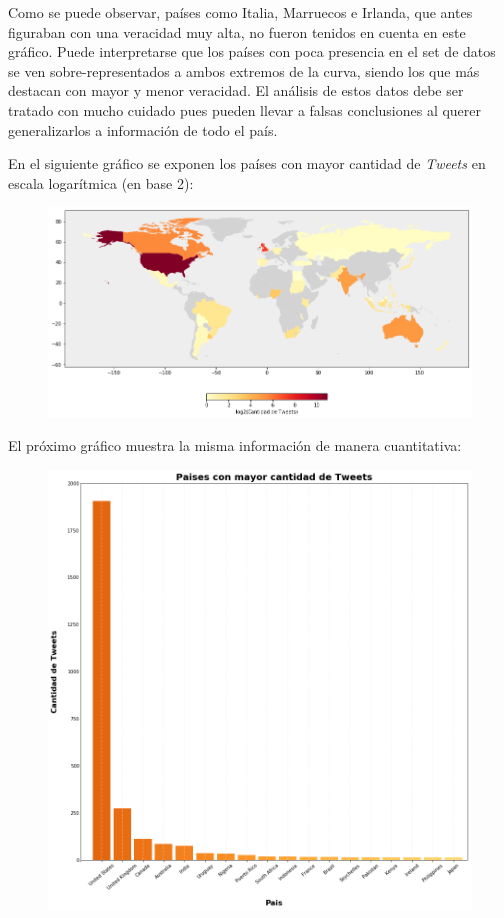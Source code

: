 \documentclass[titlepage,a4paper]{article}
\begin{document}
    Como se puede observar, países como Italia, Marruecos e Irlanda, que antes figuraban con una veracidad muy alta, no fueron tenidos en cuenta en este gráfico. Puede interpretarse que los países con poca presencia en el set de datos se ven sobre-representados a ambos extremos de la curva, siendo los que más destacan con mayor y menor veracidad. El análisis de estos datos debe ser tratado con mucho cuidado pues pueden llevar a falsas conclusiones al querer generalizarlos a información de todo el país.
    
    En el siguiente gráfico se exponen los países con mayor cantidad de \textit{Tweets} en escala logarítmica (en base 2):
    
    \begin{figure}[H]
    \centering
    \includegraphics[width=1\textwidth]{graficos/Analisis de Locacion/map_cantidad_tweets.png}
    \caption{}
    \end{figure}
    
    El próximo gráfico muestra la misma información de manera cuantitativa:
    
    \begin{figure}[H]
    \centering
    \includegraphics[width=1\textwidth]{graficos/Analisis de Locacion/paises_con_mayor_cantidad_de_tweets.png}
    \caption{}
    \end{figure}
    
\end{document}
